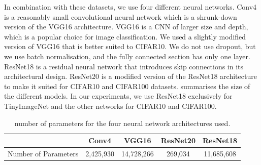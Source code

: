 In combination with these datasets, we use four different neural networks. Conv4
is a reasonably small convolutional neural network which is a
shrunk-down version of the VGG16 architecture. VGG16 is a \acl{CNN}
of larger size and depth, which is a popular choice for image classification. We
used a slightly modified version of VGG16 that is better suited to CIFAR10. We
do not use dropout, but we use batch normalisation, and the fully connected
section has only one layer. ResNet18 is a residual neural network that
introduces skip connections in its architectural design. ResNet20 is a modified
version of the ResNet18 architecture to make it suited for CIFAR10 and CIFAR100
datasets.  summarises the size of the different
models. In our experiments, we use ResNet18 exclusively for TinyImageNet and the
other networks for CIFAR10 and CIFAR100.\\


\begin{table}[ht]
  \centering
  \begin{tabular}{lcccc}
  \cline{2-5}
                       & \textbf{Conv4}     & \textbf{VGG16}      & \textbf{ResNet20} & \textbf{ResNet18}   \\ \hline
  Number of Parameters & 2,425,930 & 14,728,266 & 269,034  & 11,685,608 \\ \hline
  \end{tabular}
  \caption{ number of parameters for the four neural network architectures used.}
  \label{tab:chap1:networks_size}
\end{table}


